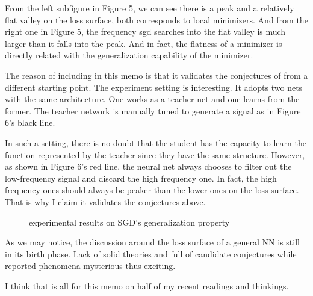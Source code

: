 \documentclass[10pt,a4paper]{article}
\begin{document}
From the left subfigure in Figure 5, we can see there is a peak and a relatively flat valley on the loss surface, both corresponds to local minimizers. And from the right one in Figure 5, the frequency sgd searches into the flat valley is much larger than it falls into the peak. And in fact, the flatness of a minimizer is directly related with the generalization capability of the minimizer.

The reason of including \cite{Gamst2017} in this memo is that it validates the conjectures of  \cite{Poggio2017}\cite{Zhang2017} from a different starting point. The experiment setting is interesting. It adopts two nets with the same architecture. One works as a teacher net and one learns from the former. The teacher network is manually tuned to generate a signal as in Figure 6\cite{Gamst2017}'s black line.

In such a setting, there is no doubt that the student has the capacity to learn the function represented by the teacher since they have the same structure. However, as shown in Figure 6's red line, the neural net always chooses to filter out the low-frequency signal and discard the high frequency one. In fact, the high frequency ones should always be peaker than the lower ones on the loss surface. That is why I claim it validates the conjectures above. 
 
 \begin{figure}[htb]
       \caption{\label{fig:f-label} experimental results on SGD's generalization property}
\end{figure}

As we may notice, the discussion around the loss surface of a general NN is still in its birth phase. Lack of solid theories and full of candidate conjectures while reported phenomena mysterious thus exciting.

I think that is all for this memo on half of my recent readings and thinkings. 
\end{document}
